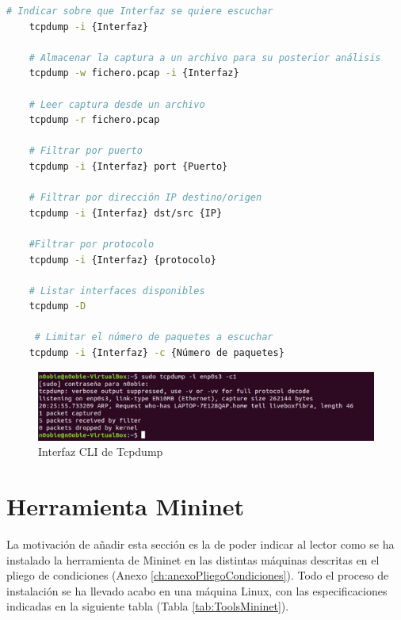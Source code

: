\begin{lstlisting}[language= bash, style=Consola2, caption={Comandos útiles con Tcpdump},label=code:tcpdump_use]
    # Indicar sobre que Interfaz se quiere escuchar
    tcpdump -i {Interfaz}
    
    # Almacenar la captura a un archivo para su posterior análisis
    tcpdump -w fichero.pcap -i {Interfaz}
    
    # Leer captura desde un archivo
    tcpdump -r fichero.pcap
    
    # Filtrar por puerto
    tcpdump -i {Interfaz} port {Puerto}
    
    # Filtrar por dirección IP destino/origen
    tcpdump -i {Interfaz} dst/src {IP}
    
    #Filtrar por protocolo
    tcpdump -i {Interfaz} {protocolo}
    
    # Listar interfaces disponibles
    tcpdump -D
    
     # Limitar el número de paquetes a escuchar
    tcpdump -i {Interfaz} -c {Número de paquetes}
\end{lstlisting}
\vspace{1cm}
\begin{figure}[ht]
    \centering
    \includegraphics[width=14cm]{archivos/img/anexos/tcpdump_cli_edited.png}
    \caption{Interfaz CLI de Tcpdump}
    \label{tcpdumpCli}
\end{figure}

\section{Herramienta Mininet}
\label{sec:ToolsMininet}
La motivación de añadir esta sección es la de poder indicar al lector como se ha instalado la herramienta de Mininet en las distintas máquinas descritas en el pliego de condiciones (Anexo \ref{ch:anexoPliegoCondiciones}). Todo el proceso de instalación se ha llevado acabo en una máquina Linux, con las especificaciones indicadas en la siguiente tabla (Tabla \ref{tab:ToolsMininet}).

\begin{table}[ht!]
    \centering
    \caption{Especificaciones máquina de instalación Mininet}
    \label{tab:ToolsMininet}
\end{table}

